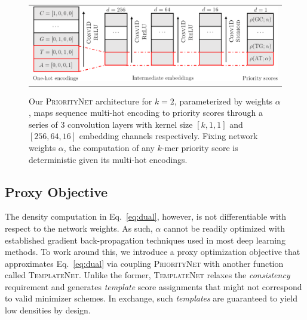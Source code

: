 \begin{figure}[ht]
\centering
\begin{tabular}{c}
\includegraphics[width=0.95\columnwidth]{minimizer_plots/Priority Net Architecture.png} 
\end{tabular}
\caption{Our \textsc{PriorityNet} architecture for $k=2$, parameterized by weights $\alpha$, maps sequence multi-hot encoding to priority scores through a series of 3 convolution layers with kernel size $[k, 1, 1]$ and $[256, 64, 16]$ embedding channels respectively. Fixing network weights $\alpha$, the computation of any $k$-mer priority score is deterministic given its multi-hot encodings.}
\label{app-msd-fig:prioritynet}
\end{figure}

\subsection{Proxy Objective}
\label{c5-sec:objective}
The density computation in Eq.~\ref{eq:dual}, however, is not differentiable with respect to the network weights. As such, $\alpha$ cannot be readily optimized with established gradient back-propagation techniques used in most deep learning methods. To work around this, we introduce a proxy optimization objective that approximates Eq.~\ref{eq:dual} via coupling \textsc{PriorityNet} with another function called \textsc{TemplateNet}. Unlike the former, \textsc{TemplateNet} relaxes the \textit{consistency} requirement and generates \textit{template} score assignments that might not correspond to valid minimizer schemes. In exchange, such \textit{templates} are guaranteed to yield low densities by design.

